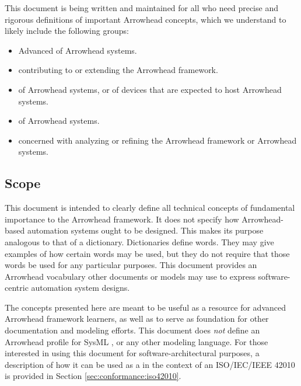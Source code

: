 This document is being written and maintained for all who need precise and rigorous definitions of important Arrowhead concepts, which we understand to likely include the following groups:

\begin{itemize}
\item Advanced  of Arrowhead systems.
\item {} contributing to or extending the Arrowhead framework.
\item {} of Arrowhead systems, or of devices that are expected to host Arrowhead systems.
\item {} of Arrowhead systems.
\item {} concerned with analyzing or refining the Arrowhead framework or Arrowhead systems.
\end{itemize}

\subsection{Scope}
\label{sec:introduction:scope}

This document is intended to clearly define all technical concepts of fundamental importance to the Arrowhead framework.
It does not specify how Arrowhead-based automation systems ought to be designed.
This makes its purpose analogous to that of a dictionary.
Dictionaries define words.
They may give examples of how certain words may be used, but they do not require that those words be used for any particular purposes.
This document provides an Arrowhead vocabulary other documents or models may use to express software-centric automation system designs.

The concepts presented here are meant to be useful as a resource for advanced Arrowhead framework learners, as well as to serve as foundation for other documentation and modeling efforts.
This document does \textit{not} define an Arrowhead profile for SysML \cite{omg2019sysml}, or any other modeling language.
For those interested in using this document for software-architectural purposes, a description of how it can be used as a  in the context of an ISO/IEC/IEEE 42010  is provided in Section \ref{sec:conformance:iso42010}.

\newpage

